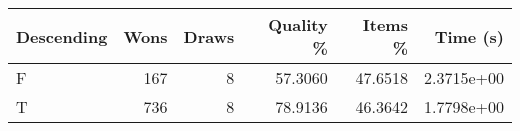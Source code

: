 \begin{tabular}{lrrrrr}
\hline
Descending & Wons & Draws & Quality \% & Items \% & Time (s)   \\
\hline
F          & 167  & 8     & 57.3060    & 47.6518  & 2.3715e+00 \\
T          & 736  & 8     & 78.9136    & 46.3642  & 1.7798e+00 \\
\hline
\end{tabular}